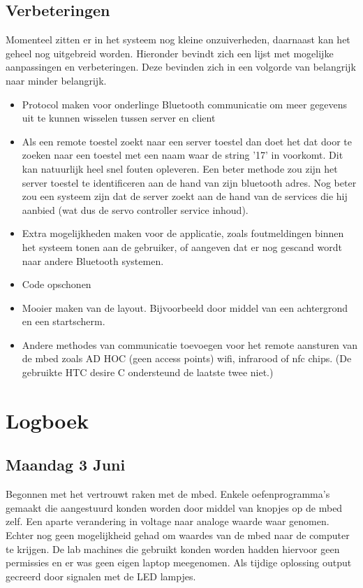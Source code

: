 \documentclass[a4paper]{article}
\begin{document}
		\subsection{Verbeteringen}
			Momenteel zitten er in het systeem nog kleine onzuiverheden, daarnaast kan het geheel nog uitgebreid worden. Hieronder bevindt zich een lijst met mogelijke aanpassingen en verbeteringen. Deze bevinden zich in een volgorde van belangrijk naar minder belangrijk.
			\begin{itemize}
				\item Protocol maken voor onderlinge Bluetooth communicatie om meer gegevens uit te kunnen wisselen tussen server en client
				\item Als een remote toestel zoekt naar een server toestel dan doet het dat door te zoeken naar een toestel met een naam waar de string '17' in voorkomt. Dit kan natuurlijk heel snel fouten opleveren. Een beter methode zou zijn het server toestel te identificeren aan de hand van zijn bluetooth adres. Nog beter zou een systeem zijn dat de server zoekt aan de hand van de services die hij aanbied (wat dus de servo controller service inhoud).
				\item Extra mogelijkheden maken voor de applicatie, zoals foutmeldingen binnen het systeem tonen aan de gebruiker, of aangeven dat er nog gescand wordt naar andere Bluetooth systemen.
				\item Code opschonen
				\item Mooier maken van de layout. Bijvoorbeeld door middel van een achtergrond en een startscherm.
				\item Andere methodes van communicatie toevoegen voor het remote aansturen van de mbed zoals AD HOC (geen access points) wifi, infrarood of nfc chips. (De gebruikte HTC desire C ondersteund de laatste twee niet.)
			\end{itemize}
	\section{Logboek}
		\subsection{Maandag 3 Juni}
			Begonnen met het vertrouwt raken met de mbed. Enkele oefenprogramma's gemaakt die aangestuurd konden worden door middel van knopjes op de mbed zelf. Een aparte verandering in voltage naar analoge waarde waar genomen. Echter nog geen mogelijkheid gehad om waardes van de mbed naar de computer te krijgen. De lab machines die gebruikt konden worden hadden hiervoor geen permissies en er was geen eigen laptop meegenomen. Als tijdige oplossing output gecreerd door signalen met de LED lampjes.
\end{document}
